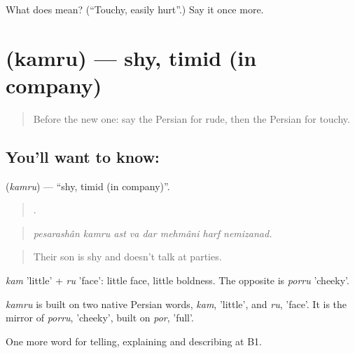\begin{tcolorbox}[breakable,colback=teal!4,colframe=teal!35!black,title={Before you move on}]
What does  mean? (\textquotedblleft{}Touchy, easily hurt\textquotedblright{}.) Say it once more.
\end{tcolorbox}
\section[\texorpdfstring{\fa{کمرو} (kamru)}{کمرو (kamru)}]{ (kamru) — shy, timid (in company)}

\label{lesson:FA-C489-kamru}



\begin{quote}
Before the new one: say the Persian for rude, then the Persian for touchy.
\end{quote}

\subsection*{You'll want to know: }
\textbf{} (\emph{kamru}) — \textquotedblleft{}shy, timid (in company)\textquotedblright{}.

\begin{quote}
       .
\end{quote}

\begin{quote}
\emph{pesarashân kamru ast va dar mehmâni harf nemizanad.}
\end{quote}

\begin{quote}
Their son is shy and doesn't talk at parties.
\end{quote}

\emph{kam} 'little' + \emph{ru} 'face': little face, little boldness. The opposite is \emph{porru} 'cheeky'.

\begin{cousinweb}
\emph{kamru} is built on two native Persian words, \emph{kam}, 'little', and \emph{ru}, 'face'. It is the mirror of \emph{porru}, 'cheeky', built on \emph{por}, 'full'.
\end{cousinweb}

\begin{grammarlens}[title={What you've built}]
One more word for telling, explaining and describing at B1.
\end{grammarlens}

